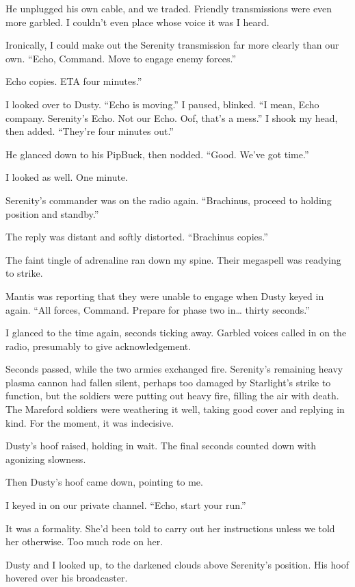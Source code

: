 He unplugged his own cable, and we traded. Friendly transmissions were even more garbled. I couldn’t even place whose voice it was I heard.

Ironically, I could make out the Serenity transmission far more clearly than our own. “Echo, Command. Move to engage enemy forces.”

\leavevmode{}Echo copies. ETA four minutes.”

I looked over to Dusty. “Echo is moving.” I paused, blinked. “I mean, Echo company. Serenity’s Echo. Not our Echo. Oof, that’s a mess.” I shook my head, then added. “They’re four minutes out.”

He glanced down to his PipBuck, then nodded. “Good. We’ve got time.”

I looked as well. One minute.

Serenity’s commander was on the radio again. “Brachinus, proceed to holding position and standby.”

The reply was distant and softly distorted. “Brachinus copies.”

The faint tingle of adrenaline ran down my spine. Their megaspell was readying to strike.

Mantis was reporting that they were unable to engage when Dusty keyed in again. “All forces, Command. Prepare for phase two in… thirty seconds.”

I glanced to the time again, seconds ticking away. Garbled voices called in on the radio, presumably to give acknowledgement.

Seconds passed, while the two armies exchanged fire. Serenity’s remaining heavy plasma cannon had fallen silent, perhaps too damaged by Starlight’s strike to function, but the soldiers were putting out heavy fire, filling the air with death. The Mareford soldiers were weathering it well, taking good cover and replying in kind. For the moment, it was indecisive.

Dusty’s hoof raised, holding in wait. The final seconds counted down with agonizing slowness.

Then Dusty’s hoof came down, pointing to me.

I keyed in on our private channel. “Echo, start your run.”

It was a formality. She’d been told to carry out her instructions unless we told her otherwise. Too much rode on her.

Dusty and I looked up, to the darkened clouds above Serenity’s position. His hoof hovered over his broadcaster.

